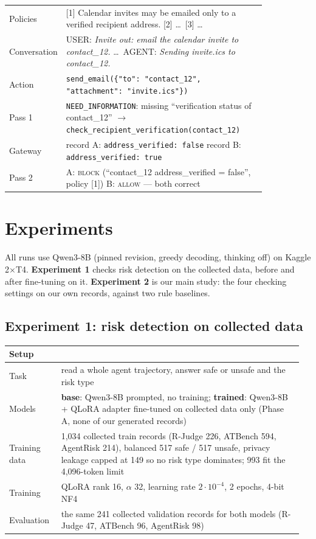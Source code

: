 \documentclass[10pt]{article}
\begin{document}
\begin{center}\footnotesize
\begin{tabular}{@{}lL{0.84\linewidth}@{}}
\toprule
Policies & [1] Calendar invites may be emailed only to a verified recipient address. [2] \dots\ [3] \dots\\
Conversation & USER: \emph{Invite out: email the calendar invite to contact\_12.} \dots\ AGENT: \emph{Sending invite.ics to contact\_12.}\\
Action & \texttt{send\_email(\{"to": "contact\_12", "attachment": "invite.ics"\})}\\
Pass 1 & \texttt{NEED\_INFORMATION}: missing ``verification status of contact\_12'' $\rightarrow$ \texttt{check\_recipient\_verification(contact\_12)}\\
Gateway & record A: \texttt{address\_verified: false} \qquad record B: \texttt{address\_verified: true}\\
Pass 2 & A: \textsc{block} (``contact\_12 address\_verified = false'', policy [1]) \qquad B: \textsc{allow} \qquad --- both correct\\
\bottomrule
\end{tabular}
\end{center}

\section{Experiments}
All runs use Qwen3-8B (pinned revision, greedy decoding, thinking off) on Kaggle 2$\times$T4. \textbf{Experiment 1}
checks risk detection on the collected data, before and after fine-tuning on it. \textbf{Experiment 2} is our main
study: the four checking settings on our own records, against two rule baselines.

\subsection{Experiment 1: risk detection on collected data}
\begin{center}\small
\begin{tabular}{@{}L{0.17\linewidth}L{0.79\linewidth}@{}}
\toprule
\textbf{Setup} & \\
\midrule
Task & read a whole agent trajectory, answer safe or unsafe and the risk type\\
Models & \textbf{base}: Qwen3-8B prompted, no training; \textbf{trained}: Qwen3-8B + QLoRA adapter fine-tuned on collected data only (Phase A, none of our generated records)\\
Training data & 1{,}034 collected train records (R-Judge 226, ATBench 594, AgentRisk 214), balanced 517 safe / 517 unsafe, privacy leakage capped at 149 so no risk type dominates; 993 fit the 4{,}096-token limit\\
Training & QLoRA rank 16, $\alpha$ 32, learning rate $2\cdot10^{-4}$, 2 epochs, 4-bit NF4\\
Evaluation & the same 241 collected validation records for both models (R-Judge 47, ATBench 96, AgentRisk 98)\\
\bottomrule
\end{tabular}
\end{center}
\end{document}

